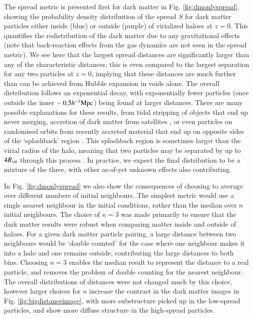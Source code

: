 The spread metric is presented first for dark matter in Fig.
\ref{fig:dmonlyspread}, showing the probability density distribution of the
spread $S$ for dark matter particles either inside (blue) or outside (purple)
of virialized haloes at $z=0$. This quantifies the redistribution of the dark
matter due to any gravitational effects (note that back-reaction effects from
the gas dynamics are not seen in the spread metric). We see here that the
largest spread distances are significantly larger than any of the
characteristic distances; this is even compared to the largest separation for
any two particles at $z=0$, implying that these distances are much further
than can be achieved from Hubble expansion in voids alone. The overall
distribution follows an exponential decay, with exponentially fewer particles
(once outside the inner $\sim 0.5 h^{-1}{\rm Mpc}{}$) being found at larger distances.
There are many possible explanations for these results, from tidal stripping
of objects that end up never merging, accretion of dark matter from
satellites \citep[see e.g. the effects in ][]{VandenBosch2018}, or even
particles on randomised orbits from recently accreted material that end up on
opposite sides of the `splashback' region \citep{Diemer2014, Adhikari2014}.
This splashback region is sometimes larger than the virial radius of the
halo, meaning that two particles may be separated by up to $4R_{\rm vir}$
through this process \citep{Diemer2017a}. In practice, we expect the final
distribution to be a mixture of the three, with other as-of-yet unknown
effects also contributing.

In Fig. \ref{fig:dmonlyspread} we also show the consequences of choosing to
average over different numbers of initial neighbours. The simplest metric
would use a single nearest neighbour in the initial conditions, rather than
the median over $n$ initial neighbours. The choice of $n=3$ was made
primarily to ensure that the dark matter results were robust when comparing
matter inside and outside of haloes. For a given dark matter particle pairing,
a large distance between two neighbours would be `double counted' for the
case where one neighbour makes it into a halo and one remains outside,
contributing the large distances to both bins. Choosing $n=3$ enables the
median result to represent the distance to a real particle, and removes the
problem of double counting for the nearest neighbour. The overall
distributions of distances were not changed much by this choice, however
larger choices for $n$ increase the contrast in the dark matter images in
Fig. \ref{fig:bigdistanceimage}, with more substructure picked up in the
low-spread particles, and show more diffuse structure in the high-spread
particles.


